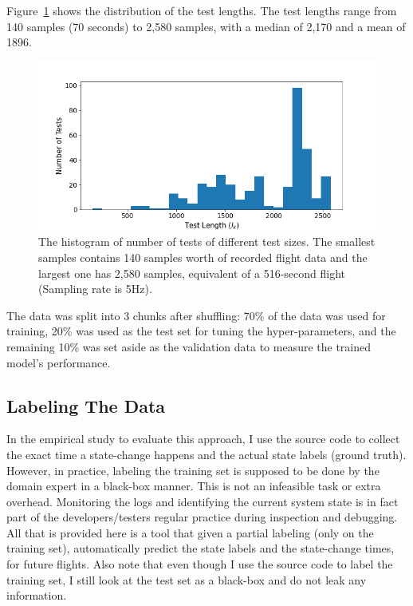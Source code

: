 Figure~\ref{fig:paparazzi_test_length} shows the distribution of the test lengths. The test lengths range from 140 samples (70 seconds) to 2,580 samples, with a median of 2,170 and a mean of 1896.
\begin{figure}
    \centering
    \includegraphics[width=\columnwidth]{RQ3-5_charts/test_lengths.png}
    \caption{The histogram of number of tests of different test sizes. The smallest samples contains 140 samples worth of recorded flight data and the largest one has 2,580 samples, equivalent of a 516-second flight (Sampling rate is 5Hz). }
    \label{fig:paparazzi_test_length}
\end{figure}

The data was split into 3 chunks after shuffling: 70\% of the data was used for training, 20\% was used as the test set for tuning the hyper-parameters, and the remaining 10\% was set aside as the validation data to measure the trained model's performance. 


\subsection{Labeling The Data}
In the empirical study to evaluate this approach, I use the source code to collect the exact time a state-change happens and the actual state labels (ground truth). However, in practice, labeling the training set is supposed to be done by the domain expert in a black-box manner. This is not an infeasible task or extra overhead. Monitoring the logs and identifying the current system state is in fact part of the developers/testers regular practice during inspection and debugging. All that is provided here is a tool that given a partial labeling (only on the training set), automatically predict the state labels and the state-change times, for future flights. 
Also note that even though I use the source code to label the training set, I still look at the test set as a black-box and do not leak any information.

